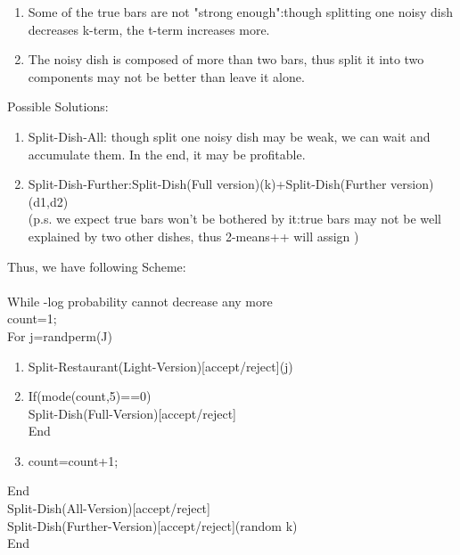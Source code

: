 \documentclass{article}
\begin{document}
\begin{spacing}{1.1}
\begin{enumerate}
\item Some of the true bars are not "strong enough":though splitting one noisy dish decreases k-term, the t-term increases more.  
\item The noisy dish is composed of more than two bars, thus split it into two components may not be better than leave it alone.
\end{enumerate}
Possible Solutions:\\
\begin{enumerate}
\item Split-Dish-All: though split one noisy dish may be weak, we can wait and accumulate them. In the end, it may be profitable.
\item Split-Dish-Further:Split-Dish(Full version)(k)+Split-Dish(Further version)(d1,d2)\\
(p.s. we expect true bars won't be bothered by it:true bars may not be well explained by two other dishes, thus 2-means++ will assign )
\end{enumerate}
Thus, we have following Scheme:\\ \\
While -log probability cannot decrease any more\\
count=1;\\
For j=randperm(J) 
\begin{enumerate}
\item Split-Restaurant(Light-Version)[accept/reject](j)
\item If(mode(count,5)==0)\\
Split-Dish(Full-Version)[accept/reject]\\
End
\item count=count+1;
\end{enumerate}
End\\
Split-Dish(All-Version)[accept/reject]\\
Split-Dish(Further-Version)[accept/reject](random k)\\
End\\


\end{spacing}
\end{document}
